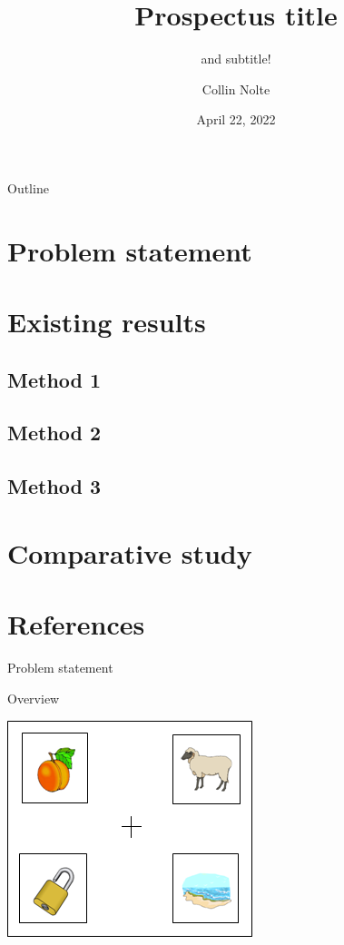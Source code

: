 \documentclass{beamer}
\title[UIowa Biostatistics]{Prospectus title}
\subtitle{and subtitle!}
\author{Collin Nolte}
\date{April 22, 2022}
\begin{document}
\begin{frame}
  \titlepage
\end{frame}

\begin{frame}{Outline}
  \tableofcontents
\end{frame}

\section{Problem statement}
\section{Existing results}
    \subsection{Method 1}
    \subsection{Method 2}
    \subsection{Method 3}
\section{Comparative study}
\section*{References}

\begin{frame}{Problem statement}

\end{frame}

\begin{frame}{Overview}
\begin{center}
\includegraphics[scale=0.4]{img/visual_world_display.png}
\end{center}
\end{frame}
\end{document}
